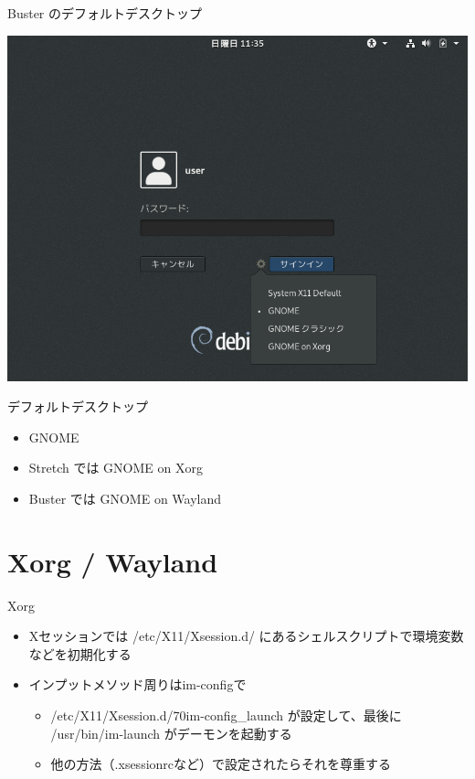 \begin{frame}{Buster のデフォルトデスクトップ}

\begin{center}
\includegraphics[keepaspectratio,width=1\hsize]{image201907/buster_gnome_0.png}
\end{center}

\end{frame}

\begin{frame}{デフォルトデスクトップ}

\begin{itemize}[<+->]
 \item GNOME
 \item Stretch では GNOME on Xorg
 \item Buster では GNOME on Wayland
\end{itemize}

\end{frame}

\section{Xorg / Wayland}

\begin{frame}{Xorg}

\begin{itemize}
 \item Xセッションでは /etc/X11/Xsession.d/ にあるシェルスクリプトで環境変数などを初期化する
 \item インプットメソッド周りはim-configで
\begin{itemize}
 \item /etc/X11/Xsession.d/70im-config\_launch が設定して、最後に /usr/bin/im-launch がデーモンを起動する
 \item 他の方法（.xsessionrcなど）で設定されたらそれを尊重する
\end{itemize}
\end{itemize}

\end{frame}

